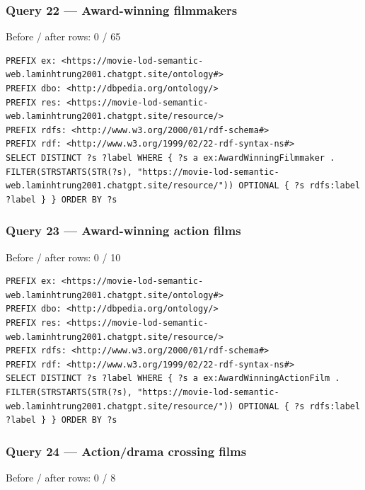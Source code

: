 \documentclass[
  11pt,
]{article}
\begin{document}
\subsubsection{\texorpdfstring{Query 22 ---
Award-\allowbreak{}wi\allowbreak{}nning
filmmakers}{Query 22 ---  filmmakers}}\label{query-22-award-winning-filmmakers}

Before / after rows: 0 / 65

\begin{verbatim}
PREFIX ex: <https://movie-lod-semantic-web.laminhtrung2001.chatgpt.site/ontology#>
PREFIX dbo: <http://dbpedia.org/ontology/>
PREFIX res: <https://movie-lod-semantic-web.laminhtrung2001.chatgpt.site/resource/>
PREFIX rdfs: <http://www.w3.org/2000/01/rdf-schema#>
PREFIX rdf: <http://www.w3.org/1999/02/22-rdf-syntax-ns#>
SELECT DISTINCT ?s ?label WHERE { ?s a ex:AwardWinningFilmmaker . FILTER(STRSTARTS(STR(?s), "https://movie-lod-semantic-web.laminhtrung2001.chatgpt.site/resource/")) OPTIONAL { ?s rdfs:label ?label } } ORDER BY ?s
\end{verbatim}

\subsubsection{\texorpdfstring{Query 23 ---
Award-\allowbreak{}wi\allowbreak{}nning action
films}{Query 23 ---  action films}}\label{query-23-award-winning-action-films}

Before / after rows: 0 / 10

\begin{verbatim}
PREFIX ex: <https://movie-lod-semantic-web.laminhtrung2001.chatgpt.site/ontology#>
PREFIX dbo: <http://dbpedia.org/ontology/>
PREFIX res: <https://movie-lod-semantic-web.laminhtrung2001.chatgpt.site/resource/>
PREFIX rdfs: <http://www.w3.org/2000/01/rdf-schema#>
PREFIX rdf: <http://www.w3.org/1999/02/22-rdf-syntax-ns#>
SELECT DISTINCT ?s ?label WHERE { ?s a ex:AwardWinningActionFilm . FILTER(STRSTARTS(STR(?s), "https://movie-lod-semantic-web.laminhtrung2001.chatgpt.site/resource/")) OPTIONAL { ?s rdfs:label ?label } } ORDER BY ?s
\end{verbatim}

\subsubsection{Query 24 --- Action/drama crossing
films}\label{query-24-actiondrama-crossing-films}

Before / after rows: 0 / 8
\end{document}
